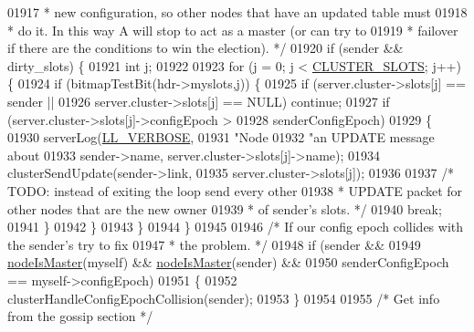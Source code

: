 \begin{DoxyCode}
{{{{{{{{{{{{{{{{{{{{{{{{{{{{{{01917 \textcolor{comment}{         * new configuration, so other nodes that have an updated table must}
01918 \textcolor{comment}{         * do it. In this way A will stop to act as a master (or can try to}
01919 \textcolor{comment}{         * failover if there are the conditions to win the election). */}
01920         \textcolor{keywordflow}{if} (sender && dirty\_slots) \{
01921             \textcolor{keywordtype}{int} j;
01922 
01923             \textcolor{keywordflow}{for} (j = 0; j < \hyperlink{cluster_8h_aa3e2cb951eebb16725ecc3f5beefd9fd}{CLUSTER\_SLOTS}; j++) \{
01924                 \textcolor{keywordflow}{if} (bitmapTestBit(hdr->myslots,j)) \{
01925                     \textcolor{keywordflow}{if} (server.cluster->slots[j] == sender ||
01926                         server.cluster->slots[j] == NULL) \textcolor{keywordflow}{continue};
01927                     \textcolor{keywordflow}{if} (server.cluster->slots[j]->configEpoch >
01928                         senderConfigEpoch)
01929                     \{
01930                         serverLog(\hyperlink{server_8h_a479b60032f8da6d8ad72e1a9d0809950}{LL\_VERBOSE},
01931                             \textcolor{stringliteral}{"Node %
01932                             \textcolor{stringliteral}{"an UPDATE message about %
01933                                 sender->name, server.cluster->slots[j]->name);
01934                         clusterSendUpdate(sender->link,
01935                             server.cluster->slots[j]);
01936 
01937                         \textcolor{comment}{/* TODO: instead of exiting the loop send every other}
01938 \textcolor{comment}{                         * UPDATE packet for other nodes that are the new owner}
01939 \textcolor{comment}{                         * of sender's slots. */}
01940                         \textcolor{keywordflow}{break};
01941                     \}
01942                 \}
01943             \}
01944         \}
01945 
01946         \textcolor{comment}{/* If our config epoch collides with the sender's try to fix}
01947 \textcolor{comment}{         * the problem. */}
01948         \textcolor{keywordflow}{if} (sender &&
01949             \hyperlink{cluster_8h_a2d8e84269474d8750565fb3fb67aa436}{nodeIsMaster}(myself) && \hyperlink{cluster_8h_a2d8e84269474d8750565fb3fb67aa436}{nodeIsMaster}(sender) &&
01950             senderConfigEpoch == myself->configEpoch)
01951         \{
01952             clusterHandleConfigEpochCollision(sender);
01953         \}
01954 
01955         \textcolor{comment}{/* Get info from the gossip section */}
}}}}}}}}}}}}}}}}}}}}}}}}}}}}}}}}
\end{DoxyCode}
